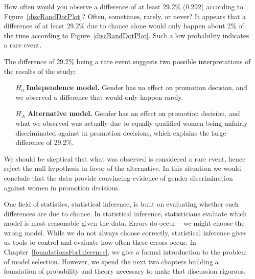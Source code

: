 \begin{example}{How often would you observe a difference of at least 29.2\% (0.292) according to Figure~\ref{discRandDotPlot}? Often, sometimes, rarely, or never?}
It appears that a difference of at least 29.2\% due to chance alone would only happen about 2\% of the time according to Figure~\ref{discRandDotPlot}. Such a low probability indicates a rare event.
\end{example}

The difference of 29.2\% being a rare event suggests two possible interpretations of the results of the study:
\begin{itemize}
\setlength{\itemsep}{0mm}
\item[$H_0$] \textbf{Independence model.} Gender has no effect on promotion decision, and we observed a difference that would only happen rarely.
\item[$H_A$] \textbf{Alternative model.} Gender has an effect on promotion decision, and what we observed was actually due to equally qualified women being unfairly discriminated against in promotion decisions, which explains the large difference of 29.2\%.
\end{itemize}
We should be skeptical that what was observed is considered a rare event, hence reject the null hypothesis in favor of the alternative. In this situation we would conclude that the data provide convincing evidence of gender discrimination against women in promotion decisions.

One field of statistics, statistical inference, is built on evaluating whether such differences are due to chance. In statistical inference, statisticians evaluate which model is most reasonable given the data. Errors do occur -- we might choose the wrong model. While we do not always choose correctly, statistical inference gives us tools to control and evaluate how often these errors occur. In Chapter~\ref{foundationsForInference}, we give a formal introduction to the problem of model selection. However, we spend the next two chapters building a foundation of probability and theory necessary to make that discussion rigorous.
